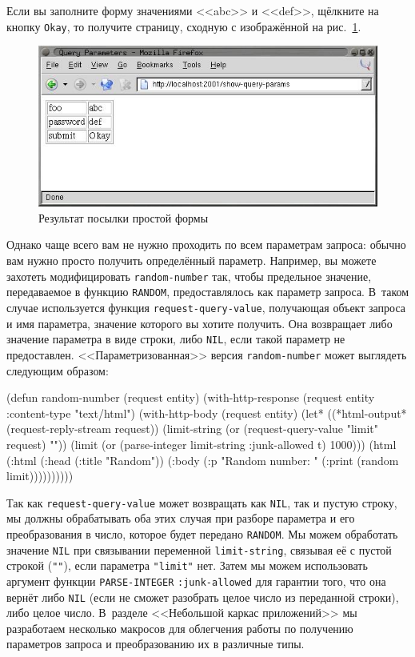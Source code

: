 Если вы заполните форму значениями <<abc>> и <<def>>, щёлкните на кнопку \texttt{Okay}, то
получите страницу, сходную с изображённой на рис.~\ref{fig:26-6}.

\begin{figure}[htb]
  \centering
  \includegraphics[scale=0.7]{images/show-query-params-2.jpg}
  \caption{Результат посылки простой формы}
  \label{fig:26-6}
\end{figure}

Однако чаще всего вам не нужно проходить по всем параметрам запроса: обычно вам нужно
просто получить определённый параметр. Например, вы можете захотеть модифицировать
\lstinline{random-number} так, чтобы предельное значение, передаваемое в функцию
\lstinline{RANDOM}, предоставлялось как параметр запроса. В~таком случае используется функция
\lstinline{request-query-value}, получающая объект запроса и имя параметра, значение которого
вы хотите получить. Она возвращает либо значение параметра в виде строки, либо
\lstinline{NIL}, если такой параметр не предоставлен. <<Параметризованная>> версия
\lstinline{random-number} может выглядеть следующим образом:

\begin{myverb}
(defun random-number (request entity)
  (with-http-response (request entity :content-type "text/html")
    (with-http-body (request entity)
      (let* ((*html-output* (request-reply-stream request))
             (limit-string (or (request-query-value "limit" request) ""))
             (limit (or (parse-integer limit-string :junk-allowed t) 1000)))
        (html
          (:html
            (:head (:title "Random"))
            (:body
              (:p "Random number: " (:print (random limit))))))))))
\end{myverb}

Так как \lstinline{request-query-value} может возвращать как \lstinline{NIL}, так и пустую
строку, мы должны обрабатывать оба этих случая при разборе параметра и его преобразования
в число, которое будет передано \lstinline{RANDOM}. Мы можем обработать значение
\lstinline{NIL} при связывании переменной \lstinline{limit-string}, связывая её с
пустой строкой (\lstinline{""}), если параметра \lstinline{"limit"} нет. Затем мы можем использовать
аргумент функции \lstinline{PARSE-INTEGER} \lstinline{:junk-allowed} для гарантии того,
что она вернёт либо \lstinline{NIL} (если не сможет разобрать целое число из переданной
строки), либо целое число. В~разделе <<Небольшой каркас приложений>> мы разработаем
несколько макросов для облегчения работы по получению параметров запроса и преобразованию
их в различные типы.

